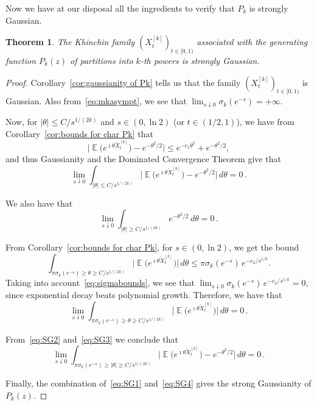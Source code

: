\documentclass[12pt]{amsart}
\newtheorem{theorem}{Theorem}
\theoremstyle{definition}
\DeclareMathOperator{\E}{\mathbb{E}}
\begin{document}
Now we have at our disposal all the ingredients to verify that $P_k$ is strongly Gaussian. 

\begin{theorem}\label{thm:strongGaussianity}
The Khinchin family $(X^{[k]}_t)_{t\in[0,1)}$ associated with the generating function
$P_k(z)$ of partitions into $k$-th powers is strongly Gaussian.
\end{theorem}

\begin{proof}
Corollary~\ref{cor:gaussianity of Pk} tells us that the family $(X^{[k]}_t)_{t\in[0,1)}$ is Gaussian. Also from~\eqref{eq:mkasympt}, we
see that $\lim_{s\downarrow 0}\sigma_k(e^{-s})=+\infty$.
\smallskip

Now, for $|\theta|\le C/s^{1/(2k)}$ and $s\in(0,\ln 2)$ (or $t\in(1/2,1)$), we have from Corollary~\ref{cor:bounds for char Pk}
that
\[
\big|\E\!\big(e^{\imath \theta\breve{X}^{[k]}_t}\big) - e^{-\theta^2/2}\big| \le e^{-c_1\theta^2} + e^{-\theta^2/2},
\]
and thus Gaussianity and the Dominated Convergence Theorem give that
\begin{equation}\label{eq:SG1}
\lim_{s\downarrow 0} \int_{|\theta|\le C/s^{1/(2k)}} \big|\E\!\big(e^{\imath \theta\breve{X}^{[k]}_t}\big) - e^{-\theta^2/2}\big|\, d\theta = 0\,.
\end{equation}

We also have that
\begin{equation}\label{eq:SG2}
\lim_{s\downarrow 0} \int_{|\theta|\ge C/s^{1/(2k)}} e^{-\theta^2/2}\, d\theta = 0\,.
\end{equation}

From Corollary~\ref{cor:bounds for char Pk}, for $s\in(0,\ln 2)$, we get the bound
\[
\int_{\pi\sigma_k(e^{-s})\ge\theta\ge C/s^{1/(2k)}} \big|\E\!\big(e^{\imath \theta\breve{X}^{[k]}_t}\big)\big|\, d\theta \le \pi\sigma_k(e^{-s})\, e^{-c_2/s^{1/k}}.
\]
Taking into account~\eqref{eq:sigmabounds}, we see that $\lim_{s\downarrow 0}\sigma_k(e^{-s})\, e^{-c_2/s^{1/k}}=0$, since exponential decay
beats polynomial growth. Therefore, we have that
\begin{equation}\label{eq:SG3}
\lim_{s\downarrow 0} \int_{\pi\sigma_k(e^{-s})\ge\theta\ge C/s^{1/(2k)}} \big|\E\!\big(e^{\imath \theta\breve{X}^{[k]}_t}\big)\big|\, d\theta = 0\,.
\end{equation}

From~\eqref{eq:SG2} and~\eqref{eq:SG3} we conclude that
\begin{equation}\label{eq:SG4}
\lim_{s\downarrow 0} \int_{\pi\sigma_k(e^{-s})\ge|\theta|\ge C/s^{1/(2k)}} \big|\E\!\big(e^{\imath \theta\breve{X}^{[k]}_t}\big) - e^{-\theta^2/2}\big|\, d\theta = 0\,.
\end{equation}

Finally, the combination of~\eqref{eq:SG1} and~\eqref{eq:SG4} gives the strong Gaussianity of $P_k(z)$.
\end{proof}
\end{document}
